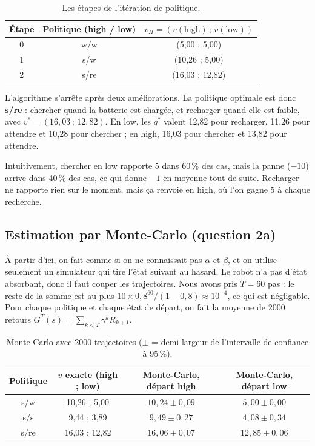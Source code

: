 \documentclass[11pt,a4paper]{article}
\begin{document}
\begin{table}[H]
  \centering
  \begin{tabular}{ccc}
    \toprule
    Étape & Politique (high / low) & $v_\Pi = (v(\text{high})\,;\, v(\text{low}))$ \\
    \midrule
    0 & w/w  & (5,00 ; 5,00) \\
    1 & s/w  & (10,26 ; 5,00) \\
    2 & s/re & (16,03 ; 12,82) \\
    \bottomrule
  \end{tabular}
  \caption{Les étapes de l'itération de politique.}
\end{table}

L'algorithme s'arrête après deux améliorations. La politique optimale est donc \textbf{s/re} : chercher quand la batterie est chargée, et recharger quand elle est faible, avec $v^* = (16,03\,;\,12,82)$. En low, les $q^*$ valent 12,82 pour recharger, 11,26 pour attendre et 10,28 pour chercher ; en high, 16,03 pour chercher et 13,82 pour attendre.

Intuitivement, chercher en low rapporte 5 dans 60\,\% des cas, mais la panne ($-10$) arrive dans 40\,\% des cas, ce qui donne $-1$ en moyenne tout de suite. Recharger ne rapporte rien sur le moment, mais ça renvoie en high, où l'on gagne 5 à chaque recherche.

\subsection{Estimation par Monte-Carlo (question 2a)}

À partir d'ici, on fait comme si on ne connaissait pas $\alpha$ et $\beta$, et on utilise seulement un simulateur qui tire l'état suivant au hasard. Le robot n'a pas d'état absorbant, donc il faut couper les trajectoires. Nous avons pris $T = 60$ pas : le reste de la somme est au plus $10 \times 0,8^{60} / (1 - 0,8) \approx 10^{-4}$, ce qui est négligable. Pour chaque politique et chaque état de départ, on fait la moyenne de 2000 retours $G^T(s) = \sum_{k<T} \gamma^k R_{k+1}$.

\begin{table}[H]
  \centering
  \begin{tabular}{cccc}
    \toprule
    Politique & $v$ exacte (high ; low) & Monte-Carlo, départ high & Monte-Carlo, départ low \\
    \midrule
    s/w  & 10,26 ; 5,00  & $10,24 \pm 0,09$ & $5,00 \pm 0,00$ \\
    s/s  & 9,44 ; 3,89   & $9,49 \pm 0,27$  & $4,08 \pm 0,34$ \\
    s/re & 16,03 ; 12,82 & $16,06 \pm 0,07$ & $12,85 \pm 0,06$ \\
    \bottomrule
  \end{tabular}
  \caption{Monte-Carlo avec 2000 trajectoires ($\pm$ = demi-largeur de l'intervalle de confiance à 95\,\%).}
  \label{tab:mc}
\end{table}
\end{document}
